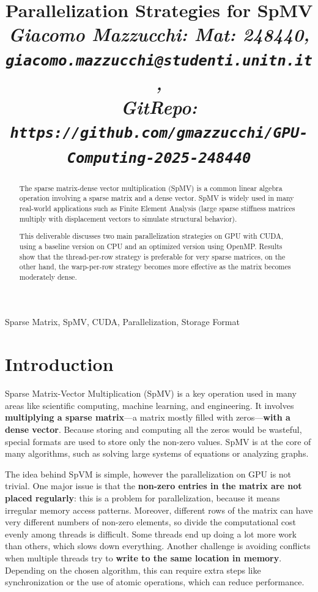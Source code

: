 \documentclass[conference]{IEEEtran}
\begin{document}
\title{Parallelization Strategies for SpMV \\
\footnotesize \textit{Giacomo Mazzucchi: Mat: 248440, \texttt{giacomo.mazzucchi@studenti.unitn.it}, \\GitRepo: \texttt{https://github.com/gmazzucchi/GPU-Computing-2025-248440}}}

\maketitle

\begin{abstract}
The sparse matrix-dense vector multiplication (SpMV) is a common linear algebra operation involving a sparse matrix and a dense vector. SpMV is widely used in many real-world applications such as Finite Element Analysis (large sparse stiffness matrices multiply with displacement vectors to simulate structural behavior).

This deliverable discusses two main parallelization strategies on GPU with CUDA, using a baseline version on CPU and an optimized version using OpenMP. Results show that the thread-per-row strategy is preferable for very sparse matrices, on the other hand, the warp-per-row strategy becomes more effective as the matrix becomes moderately dense.
\end{abstract}

\begin{IEEEkeywords}
Sparse Matrix, SpMV, CUDA, Parallelization, Storage Format
\end{IEEEkeywords}

\section{Introduction}
Sparse Matrix-Vector Multiplication (SpMV) is a key operation used in many areas like scientific computing, machine learning, and engineering. It involves \textbf{multiplying a sparse matrix}—a matrix mostly filled with zeros—\textbf{with a dense vector}. Because storing and computing all the zeros would be wasteful, special formats are used to store only the non-zero values. SpMV is at the core of many algorithms, such as solving large systems of equations or analyzing graphs.

The idea behind SpVM is simple, however the parallelization on GPU is not trivial. One major issue is that the \textbf{non-zero entries in the matrix are not placed regularly}: this is a problem for parallelization, because it means irregular memory access patterns. Moreover, different rows of the matrix can have very different numbers of non-zero elements, so divide the computational cost evenly among threads is difficult. Some threads end up doing a lot more work than others, which slows down everything. Another challenge is avoiding conflicts when multiple threads try to \textbf{write to the same location in memory}. Depending on the chosen algorithm, this can require extra steps like synchronization or the use of atomic operations, which can reduce performance.
\end{document}
